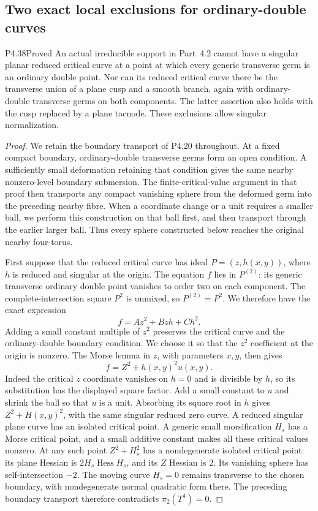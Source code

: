 \subsection{Two exact local exclusions for ordinary-double curves}

\begin{statement}{P4.38}{Proved}
An actual irreducible support in Part~4.2 cannot have a singular
planar reduced critical curve at a point at which every generic
transverse germ is an ordinary double point. Nor can its reduced
critical curve there be the transverse union of a plane cusp
and a smooth branch, again with ordinary-double transverse germs
on both components. The latter assertion also holds with the
cusp replaced by a plane tacnode.
These exclusions allow singular normalization.
\end{statement}
\begin{proof}
We retain the boundary transport of P4.20 throughout. At a fixed
compact boundary, ordinary-double transverse germs form an open
condition. A sufficiently small deformation retaining that
condition gives the same nearby nonzero-level boundary
submersion. The finite-critical-value argument in that proof
then transports any compact vanishing sphere from the deformed
germ into the preceding nearby fibre. When a coordinate change
or a unit requires a smaller ball, we perform this construction
on that ball first, and then transport through the earlier
larger ball. Thus every sphere constructed below reaches the
original nearby four-torus.

First suppose that the reduced critical curve has ideal
$P=(z,h(x,y))$, where $h$ is reduced and singular at the
origin. The equation $f$ lies in $P^{(2)}$: its generic
transverse ordinary double point vanishes to order two on
each component. The complete-intersection square $P^2$ is
unmixed, so $P^{(2)}=P^2$. We therefore have the exact expression
\[
 f=A z^2+Bzh+Ch^2.
\]
Adding a small constant multiple of $z^2$ preserves the critical
curve and the ordinary-double boundary condition. We choose it
so that the $z^2$ coefficient at the origin is nonzero. The
Morse lemma in $z$, with parameters $x,y$, then gives
\[
 f=Z^2+h(x,y)^2u(x,y).
\]
Indeed the critical $z$ coordinate vanishes on $h=0$ and
is divisible by $h$, so its substitution has the displayed
square factor. Add a small constant to $u$ and shrink the
ball so that $u$ is a unit. Absorbing its square root in $h$
gives $Z^2+H(x,y)^2$, with the same singular reduced zero
curve. A reduced singular plane curve has an isolated critical
point. A generic small morsification $H_s$ has a Morse critical
point, and a small additive constant makes all these critical
values nonzero. At any such point $Z^2+H_s^2$ has a
nondegenerate isolated critical point: its plane Hessian is
$2H_s\operatorname{Hess}H_s$, and its $Z$ Hessian is $2$.
Its vanishing sphere has self-intersection $-2$.
The moving curve $H_s=0$ remains transverse to the chosen
boundary, with nondegenerate normal quadratic form there.
The preceding boundary transport therefore contradicts
$\pi_2(T^4)=0$.


\end{proof}
